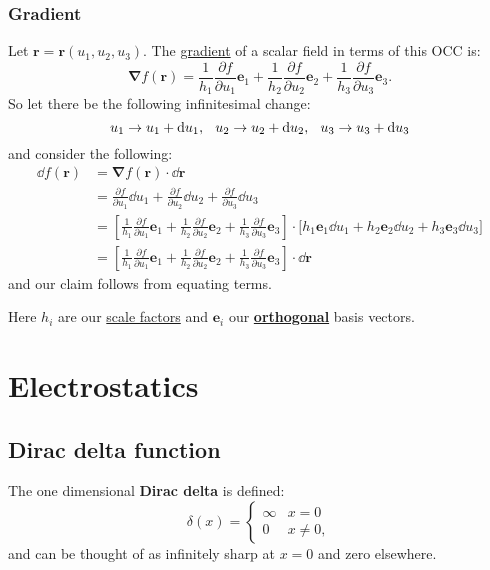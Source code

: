 \documentclass{article}
\begin{document}
\subsubsection{Gradient}
Let $\boldsymbol{r}=\boldsymbol{r}(u_1,u_2,u_3)$.
The \underline{gradient} of a scalar field
in terms of this OCC is:
$$\boldsymbol{\nabla}f(\boldsymbol{r})
=\frac{1}{h_1}\frac{\partial f}{\partial u_1}\boldsymbol{e}_1
+\frac{1}{h_2}\frac{\partial f}{\partial u_2}\boldsymbol{e}_2
+\frac{1}{h_3}\frac{\partial f}{\partial u_3}\boldsymbol{e}_3.$$
So let there be the following infinitesimal change:
$$u_1\rightarrow u_1+\dd u_1,\hspace{0.1in}
u_2\rightarrow u_2+\dd u_2,\hspace{0.1in}
u_3\rightarrow u_3+\dd u_3$$
and consider the following:
\begin{align*}
    \dd f(\boldsymbol{r})
    &=\boldsymbol{\nabla}f(\boldsymbol{r})
    \cdot\dd \boldsymbol{r} \\
    &=\frac{\partial f}{\partial u_1}\dd u_1
    +\frac{\partial f}{\partial u_2}\dd u_2
    +\frac{\partial f}{\partial u_3}\dd u_3 \\
    &=\left[\frac{1}{h_1}\frac{\partial f}{\partial u_1}\boldsymbol{e}_1
    +\frac{1}{h_2}\frac{\partial f}{\partial u_2}\boldsymbol{e}_2
    +\frac{1}{h_3}\frac{\partial f}{\partial u_3}\boldsymbol{e}_3\right]
    \cdot\bigl[h_1\boldsymbol{e}_1\dd u_1
    +h_2\boldsymbol{e}_2\dd u_2+h_3\boldsymbol{e}_3\dd u_3\bigr] \\
    &=\left[\frac{1}{h_1}\frac{\partial f}{\partial u_1}\boldsymbol{e}_1
    +\frac{1}{h_2}\frac{\partial f}{\partial u_2}\boldsymbol{e}_2
    +\frac{1}{h_3}\frac{\partial f}{\partial u_3}\boldsymbol{e}_3\right]
    \cdot\dd\boldsymbol{r}
\end{align*}
and our claim follows from equating terms.

Here $h_i$ are our \underline{scale factors}
and $\boldsymbol{e}_i$ our \underline{\textbf{orthogonal}} basis vectors.

\newpage

\section{Electrostatics}

\subsection{Dirac delta function}
The one dimensional \textbf{Dirac delta} is defined:
$$\delta(x) =
    \left\{
	\begin{array}{ll}
		\infty  & \mbox{} x=0 \\
		0 & \mbox{} x\neq0,
	\end{array}
    \right.$$
and can be thought of as infinitely sharp at $x=0$ and zero elsewhere. 
\end{document}
